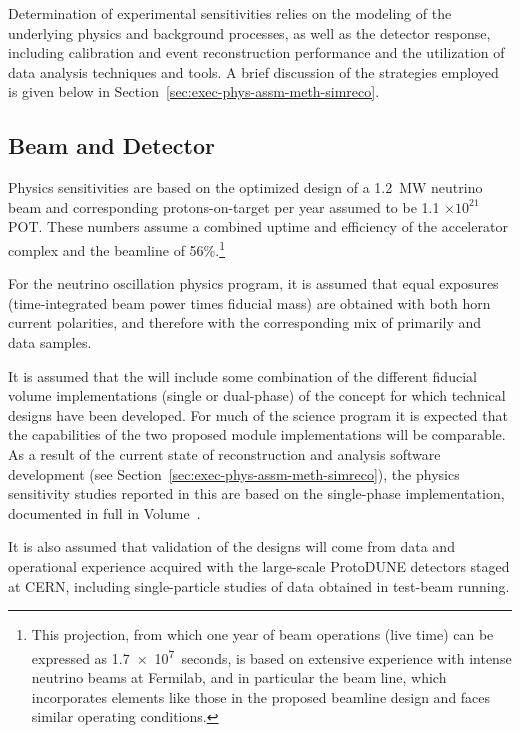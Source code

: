 Determination of experimental sensitivities relies on the
modeling of the underlying physics and background processes,
as well as the detector response, including calibration and
event reconstruction performance and the utilization of data
analysis techniques and tools.
A brief discussion of the strategies employed is given below
in Section~\ref{sec:exec-phys-assm-meth-simreco}. 

\subsection{Beam and Detector}
\label{sec:exec-phys-assm-meth-beamdetector}

Physics sensitivities are based on 
the optimized design of a \SI{1.2}{MW} neutrino beam and
corresponding protons-on-target per year assumed to
be 1.1 $\times 10^{21}$ POT.  These numbers assume a combined
uptime and efficiency of the \fnal accelerator complex and the
 beamline of 56\%.\footnote{This projection, from which one  
year of  beam operations (live time) can be expressed as \SI{1.7e7}{seconds}, 
is based on extensive 
experience with intense neutrino beams at Fermilab, and in particular 
the  beam line, which incorporates elements like those in the  
proposed  beamline design and faces similar operating conditions.} 

For the neutrino oscillation physics program, it is assumed that
equal exposures (time-integrated beam power times fiducial mass) are obtained with both horn current polarities,
and therefore with the corresponding mix of primarily \numu
and \anumu data samples.

It is assumed that the   will include some
combination of the different \nominalmodsize fiducial volume
implementations (single or dual-phase) of the  concept
for which technical designs have been developed.                                                     
For much of the science program it is expected that the
capabilities of the two proposed  module 
implementations will be comparable.  As a result of the
current state of reconstruction and analysis software development
(see Section~\ref{sec:exec-phys-assm-meth-simreco}), the
physics sensitivity studies reported in this  are based on
the single-phase  implementation,
documented in full in Volume~\volnumbersp{}. %

It is also assumed that validation of the   
designs will come from data and operational experience acquired 
with the large-scale ProtoDUNE detectors staged at CERN, 
including single-particle studies of data obtained 
in test-beam running.  

